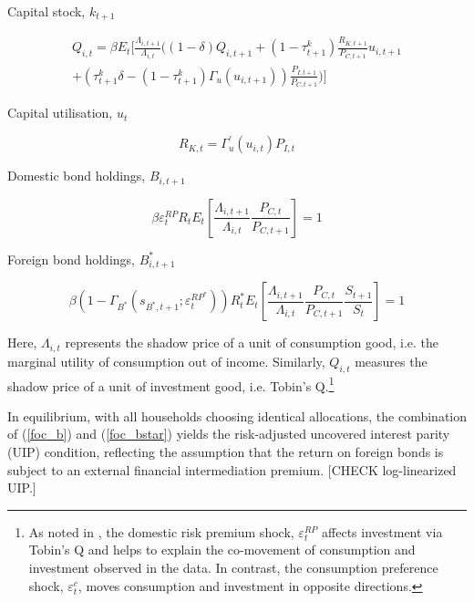 \documentclass[a4paper,11pt]{article}
\numberwithin{equation}{section}
\begin{document}
	Capital stock, $k_{t+1}$
	
	\begin{equation} \label{foc_capital}
	\begin{split}
	Q_{i,t}=\beta E_t\Bigg[\frac{\Lambda_{i,t+1}}{\Lambda_{i,t}}\Bigg((1-\delta)Q_{i,t+1}+(1-\tau_{t+1}^k)\frac{R_{K,t+1}}{P_{C,t+1}}u_{i,t+1}\\
	+\left(\tau_{t+1}^k\delta-(1-\tau_{t+1}^k)\Gamma_u(u_{i,t+1})\right)\frac{P_{I,t+1}}{P_{C,t+1}}\Bigg)\Bigg]
	\end{split}
	\end{equation}
	
	Capital utilisation, $u_t$
	
	\begin{equation} \label{foc_u}
	R_{K,t}=\Gamma_u^'(u_{i,t})P_{I,t}
	\end{equation}
	
	Domestic bond holdings, $B_{i,t+1}$
	
	\begin{equation} \label{foc_b}
	\beta \varepsilon_t^{RP}R_tE_t\left[\frac{\Lambda_{i,t+1}}{\Lambda_{i,t}}\frac{P_{C,t}}{P_{C,t+1}}\right]=1
	\end{equation}
	
	Foreign bond holdings, $B^*_{i,t+1}$
	
	\begin{equation} \label{foc_bstar}
	\beta\left(1-\Gamma_{B^*}\left(s_{B^*,t+1};\varepsilon^{RP^*}_t\right)\right)R^*_tE_t\left[\frac{\Lambda_{i,t+1}}{\Lambda_{i,t}}\frac{P_{C,t}}{P_{C,t+1}}\frac{S_{t+1}}{S_t}\right]=1
	\end{equation}
	
	Here, $\Lambda_{i,t}$ represents the shadow price of a unit of consumption good, i.e. the marginal utility of consumption out of income. Similarly, $Q_{i,t}$ measures the shadow price of a unit of investment good, i.e. Tobin's Q.\footnote{As noted in \cite{christoffel2008}, the domestic risk premium shock, $\varepsilon_t^{RP}$ affects investment via Tobin's Q and helps to explain the co-movement of consumption and investment observed in the data. In contrast, the consumption preference shock, $\varepsilon^c_t$, moves consumption and investment in opposite directions.}
	
	{\color{red}In equilibrium, with all households choosing identical allocations, the combination of (\ref{foc_b}) and (\ref{foc_bstar}) yields the risk-adjusted uncovered interest parity (UIP) condition, reflecting the assumption that the return on foreign bonds is subject to an external financial intermediation premium. [CHECK log-linearized UIP.]}
	
\end{document}
